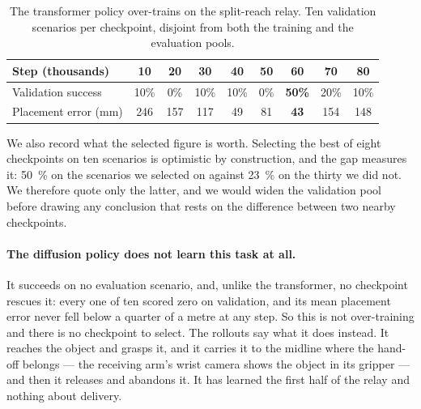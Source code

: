 \begin{table}[t]
\centering
\small
\begin{tabular}{lcccccccc}
\toprule
Step (thousands) & 10 & 20 & 30 & 40 & 50 & 60 & 70 & 80 \\
\midrule
Validation success & 10\% & 0\% & 10\% & 10\% & 0\% & \textbf{50\%} & 20\% & 10\% \\
Placement error (\si{\mm}) & 246 & 157 & 117 & 49 & 81 & \textbf{43} & 154 & 148 \\
\bottomrule
\end{tabular}
\caption{The transformer policy over-trains on the split-reach relay. Ten
validation scenarios per checkpoint, disjoint from both the training and the
evaluation pools.}
\label{tab:val-curve}
\end{table}

We also record what the selected figure is worth. Selecting the best of eight
checkpoints on ten scenarios is optimistic by construction, and the gap
measures it: \SI{50}{\percent} on the scenarios we selected on against
\SI{23}{\percent} on the thirty we did not. We therefore quote only the
latter, and we would widen the validation pool before drawing any conclusion
that rests on the difference between two nearby checkpoints.

\paragraph{The diffusion policy does not learn this task at all.}
It succeeds on no evaluation scenario, and, unlike the transformer, no
checkpoint rescues it: every one of ten scored zero on validation, and its
mean placement error never fell below a quarter of a metre at any step. So
this is not over-training and there is no checkpoint to select. The rollouts
say what it does instead. It reaches the object and grasps it, and it carries
it to the midline where the hand-off belongs --- the receiving arm's wrist
camera shows the object in its gripper --- and then it releases and abandons
it. It has learned the first half of the relay and nothing about delivery.

